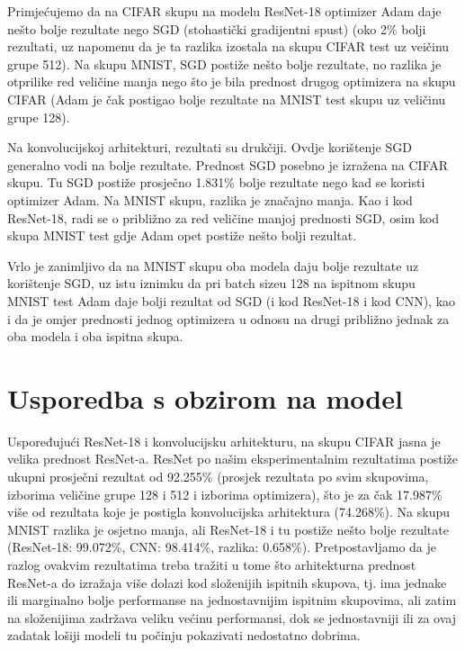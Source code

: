 Primjećujemo da na CIFAR skupu na modelu ResNet-18 optimizer Adam daje nešto bolje rezultate nego SGD (stohastički gradijentni spust) (oko 2\% bolji rezultati, uz napomenu da je ta razlika izostala na skupu CIFAR test uz veičinu grupe 512). Na skupu MNIST, SGD postiže nešto bolje rezultate, no razlika je otprilike red veličine manja nego što je bila prednost drugog optimizera na skupu CIFAR (Adam je čak postigao bolje rezultate na MNIST test skupu uz veličinu grupe 128).

\bigskip

Na konvolucijskoj arhitekturi, rezultati su drukčiji. Ovdje korištenje SGD generalno vodi na bolje rezultate. Prednost SGD posebno je izražena na CIFAR skupu. Tu SGD postiže prosječno 1.831\% bolje rezultate nego kad se koristi optimizer Adam. Na MNIST skupu, razlika je značajno manja. Kao i kod ResNet-18, radi se o približno za red veličine manjoj prednosti SGD, osim kod skupa MNIST test gdje Adam opet postiže nešto bolji rezultat.

\bigskip

Vrlo je zanimljivo da na MNIST skupu oba modela daju bolje rezultate uz korištenje SGD, uz istu iznimku da pri batch sizeu 128 na ispitnom skupu MNIST test Adam daje bolji rezultat od SGD (i kod ResNet-18 i kod CNN), kao i da je omjer prednosti jednog optimizera u odnosu na drugi približno jednak za oba modela i oba ispitna skupa.

\bigskip

\section{Usporedba s obzirom na model}

Uspoređujući ResNet-18 i konvolucijsku arhitekturu, na skupu CIFAR jasna je velika prednost ResNet-a. ResNet po našim eksperimentalnim rezultatima postiže ukupni prosječni rezultat od 92.255\% (prosjek rezultata po svim skupovima, izborima veličine grupe 128 i 512 i izborima optimizera), što je za čak 17.987\% više od rezultata koje je postigla konvolucijska arhitektura (74.268\%). Na skupu MNIST razlika je osjetno manja, ali ResNet-18 i tu postiže nešto bolje rezultate (ResNet-18: 99.072\%, CNN: 98.414\%, razlika: 0.658\%). Pretpostavljamo da je razlog ovakvim rezultatima treba tražiti u tome što arhitekturna prednost ResNet-a do izražaja više dolazi kod složenijih ispitnih skupova, tj. ima jednake ili marginalno bolje performanse na jednostavnijim ispitnim skupovima, ali zatim na složenijima zadržava veliku većinu performansi, dok se jednostavniji ili za ovaj zadatak lošiji modeli tu počinju pokazivati nedostatno dobrima.


